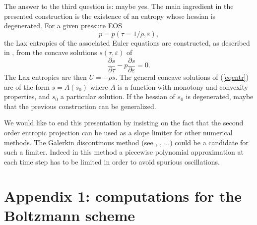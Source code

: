 \documentclass{fldauth}
\theoremstyle{plain}
\theoremstyle{plain}
\theoremstyle{plain}
\theoremstyle{plain}
\theoremstyle{plain}
\theoremstyle{plain}
\begin{document}
The answer to the third question is: maybe yes. The main
ingredient in the presented construction is the existence of an
entropy whose hessian is degenerated. For a given pressure EOS
\begin{equation}\label{eosg}
    p=p(\tau=1/\rho,\varepsilon),
\end{equation}
the Lax entropies of the associated Euler equations are
constructed, as described in \cite{harten98}, from the concave
solutions $s(\tau,\varepsilon)$ of
\begin{equation}\label{eqentr}
\frac{{\partial s}} {{\partial \tau }} - p\frac{{\partial s}}
{{\partial \varepsilon }} = 0.
\end{equation}
The Lax entropies are then $U=-\rho s$. The general concave
solutions of (\ref{eqentr}) are of the form $s=A(s_0)$ where $A$
is a function with monotony and convexity properties, and $s_0$ a
particular solution. If the hessian of $s_0$ is degenerated, maybe
that the previous construction can be generalized.

We would like to end this presentation by insisting on the fact
that the second order entropic projection can be used as a slope
limiter for other numerical methods. The Galerkin discontinous
method (see \cite{lesaint74}, \cite{cockburn89},
\cite{feistauer02}...) could be a candidate for such a limiter.
Indeed in this method a piecewise polynomial approximation at each
time step has to be limited in order to avoid spurious
oscillations.

\section*{Appendix 1: computations for the Boltzmann scheme}
\end{document}
